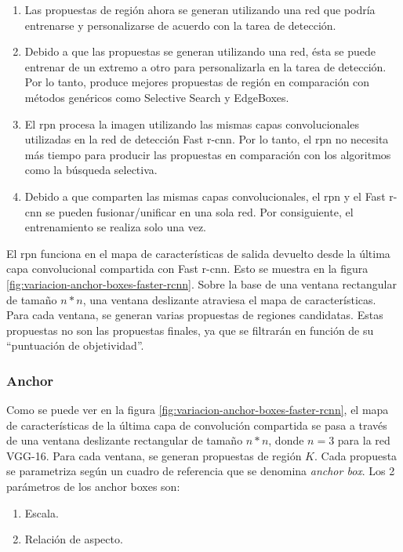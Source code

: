 \begin{enumerate}
    \item Las propuestas de región ahora se generan utilizando una red que podría entrenarse y personalizarse de acuerdo con la tarea de detección.
    \item Debido a que las propuestas se generan utilizando una red, ésta se puede entrenar de un extremo a otro para personalizarla en la tarea de detección. Por lo tanto, produce mejores propuestas de región en comparación con métodos genéricos como Selective Search y EdgeBoxes.
    \item El \gls{rpn} procesa la imagen utilizando las mismas capas convolucionales utilizadas en la red de detección Fast \gls{r-cnn}. Por lo tanto, el \gls{rpn} no necesita más tiempo para producir las propuestas en comparación con los algoritmos como la búsqueda selectiva.
    \item Debido a que comparten las mismas capas convolucionales, el \gls{rpn} y el Fast \gls{r-cnn} se pueden fusionar/unificar en una sola red. Por consiguiente, el entrenamiento se realiza solo una vez.
\end{enumerate}

El \gls{rpn} funciona en el mapa de características de salida devuelto desde la última capa convolucional compartida con Fast \gls{r-cnn}. Esto se muestra en la figura \ref{fig:variacion-anchor-boxes-faster-rcnn}. Sobre la base de una ventana rectangular de tamaño $n*n$, una ventana deslizante atraviesa el mapa de características. Para cada ventana, se generan varias propuestas de regiones candidatas. Estas propuestas no son las propuestas finales, ya que se filtrarán en función de su ``puntuación de objetividad''.

\subsubsection*{Anchor}
\label{subsubsec:anchor-faster-rcnn}

Como se puede ver en la figura \ref{fig:variacion-anchor-boxes-faster-rcnn}, el mapa de características de la última capa de convolución compartida se pasa a través de una ventana deslizante rectangular de tamaño $n*n$, donde $n = 3$ para la red VGG-16. Para cada ventana, se generan propuestas de región $K$. Cada propuesta se parametriza según un cuadro de referencia que se denomina \textit{anchor box}. Los 2 parámetros de los anchor boxes son:

\begin{enumerate}
    \item Escala.
    \item Relación de aspecto.
\end{enumerate}

